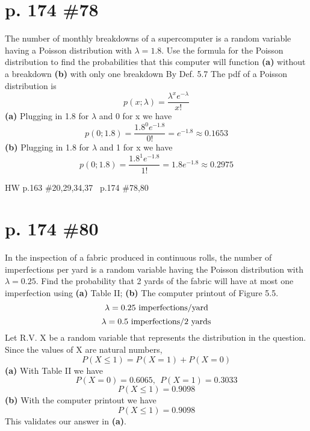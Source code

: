 \documentclass[12pt]{article}
\begin{document}
	\section[20pt]{p. 174 \#78}
	The number of monthly breakdowns of a supercomputer is a random variable having a Poisson distribution with \(\lambda=1.8\). Use the formula for the Poisson distribution to find the probabilities that this computer will function \newline
	\textbf{(a)} without a breakdown \newline
	\textbf{(b)} with only one breakdown
	\newline
	\newline
	By Def. 5.7 The pdf of a Poisson distribution is
	\[p(x;\lambda)=\frac{\lambda^xe^{-\lambda}}{x!}\]
	\textbf{(a)} Plugging in 1.8 for \(\lambda\) and 0 for x we have
	\[p(0;1.8)=\frac{1.8^0e^{-1.8}}{0!}=e^{-1.8}\approx0.1653\]
	\newline
	\newline
	\textbf{(b)} Plugging in 1.8 for \(\lambda\) and 1 for x we have
	\[p(0;1.8)=\frac{1.8^1e^{-1.8}}{1!}=1.8e^{-1.8}\approx0.2975\]
	\newpage
	\maketitle HW p.163 \#20,29,34,37 \ p.174 \#78,80
	\section[20pt]{p. 174 \#80}
	In the inspection of a fabric produced in continuous rolls, the number of imperfections per yard is a random variable having the Poisson distribution with \(\lambda=0.25\). Find the probability that 2 yards of the fabric will have at most one imperfection using \newline
	\textbf{(a)} Table II; \newline
	\textbf{(b)} The computer printout of Figure 5.5.
	\newline
	\newline
	\[\lambda = 0.25\textup{ imperfections/yard} \]
	\[\lambda = 0.5\textup{ imperfections/2 yards}\]
	Let R.V. X be a random variable that represents the distribution in the question.
	Since the values of X are natural numbers,
	\[P(X\leq1) = P(X=1) + P(X=0)\]
	\textbf{(a)} With Table II we have
	\[P(X=0)=0.6065,\ \ P(X=1)=0.3033\]
	\[P(X\leq 1)=0.9098\]
	 \newline
	\newline
	\textbf{(b)} With the computer printout we have
	\[P(X\leq1) = 0.9098\]
	This validates our answer in \textbf{(a)}.
\end{document}

